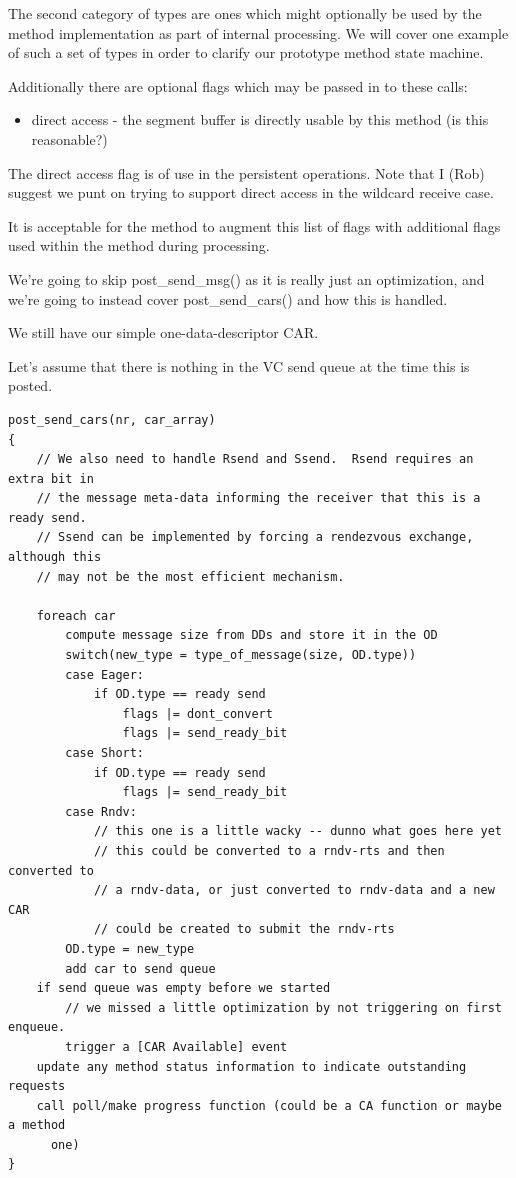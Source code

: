 \documentclass[11pt,letterpaper]{article}
\begin{document}
The second category of types are ones which might optionally be used by the
method implementation as part of internal processing.  We will cover one
example of such a set of types in order to clarify our prototype method state
machine.

Additionally there are optional flags which may be passed in to these calls:
\begin{itemize}
\item direct access - the segment buffer is directly usable by this method (is
  this reasonable?)
\end{itemize}

The direct access flag is of use in the persistent operations.  Note that I
(Rob) suggest we punt on trying to support direct access in the wildcard
receive case.

It is acceptable for the method to augment this list of flags with additional
flags used within the method during processing.

We're going to skip post\_send\_msg() as it is really just an optimization, and
we're going to instead cover post\_send\_cars() and how this is handled.

We still have our simple one-data-descriptor CAR.

Let's assume that there is nothing in the VC send queue at the time this is
posted.

\begin{verbatim}
post_send_cars(nr, car_array)
{
    // We also need to handle Rsend and Ssend.  Rsend requires an extra bit in
    // the message meta-data informing the receiver that this is a ready send.
    // Ssend can be implemented by forcing a rendezvous exchange, although this
    // may not be the most efficient mechanism.

    foreach car
        compute message size from DDs and store it in the OD
        switch(new_type = type_of_message(size, OD.type))
        case Eager:
            if OD.type == ready send
                flags |= dont_convert
                flags |= send_ready_bit
        case Short:
            if OD.type == ready send
                flags |= send_ready_bit
        case Rndv:
            // this one is a little wacky -- dunno what goes here yet
            // this could be converted to a rndv-rts and then converted to
            // a rndv-data, or just converted to rndv-data and a new CAR
            // could be created to submit the rndv-rts
        OD.type = new_type
        add car to send queue
    if send queue was empty before we started
        // we missed a little optimization by not triggering on first enqueue.
        trigger a [CAR Available] event
    update any method status information to indicate outstanding requests
    call poll/make progress function (could be a CA function or maybe a method 
      one)
}
\end{verbatim}
\end{document}
